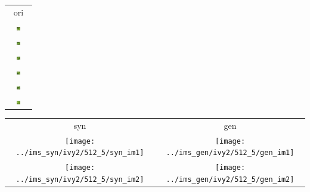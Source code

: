 \documentclass[letter]{article}
\begin{document}
\newpage

\begin{table}[h!]
	\centering
	\begin{tabular}{c}
		ori\tabularnewline
		\includegraphics[width=0.17\textwidth]{../data/ivy2/512/1} \tabularnewline		\includegraphics[width=0.17\textwidth]{../data/ivy2/512/2} \tabularnewline		\includegraphics[width=0.17\textwidth]{../data/ivy2/512/3} \tabularnewline		\includegraphics[width=0.17\textwidth]{../data/ivy2/512/4} \tabularnewline		\includegraphics[width=0.17\textwidth]{../data/ivy2/512/5} \tabularnewline		\includegraphics[width=0.17\textwidth]{../data/ivy2/512/6} \tabularnewline
	\end{tabular}
	\begin{tabular}{cc}
		syn & gen\tabularnewline
		\texttt{[image: ../ims\_syn/ivy2/512\_5/syn\_im1]} & \texttt{[image: ../ims\_gen/ivy2/512\_5/gen\_im1]} \tabularnewline
		\texttt{[image: ../ims\_syn/ivy2/512\_5/syn\_im2]} & \texttt{[image: ../ims\_gen/ivy2/512\_5/gen\_im2]} \tabularnewline

\end{tabular}
\end{table}
\end{document}
